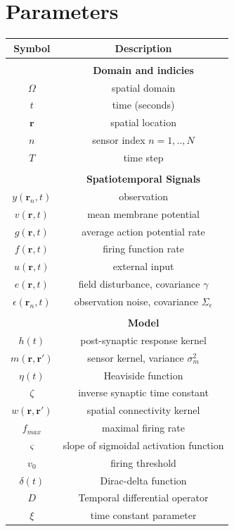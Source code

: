 \documentclass[12pt]{iopart}
\begin{document}
\section{Parameters} 
\begin{tabular}
	{c|c} Symbol & Description \\
	\hline
	\\ & \textbf{Domain and indicies} \\
	\hline
	$\Omega$ & spatial domain \\
	$t$ & time (seconds) \\
	$\mathbf{r}$ & spatial location \\
	$n$ & sensor index $n=1,..,N$ \\
	$T$ & time step \\
	\\ & \textbf{Spatiotemporal Signals} \\
	\hline
	$y(\mathbf{r}_n,t)$ & observation \\
	$v(\mathbf{r},t)$ & mean membrane potential \\
	$g(\mathbf{r},t)$ & average action potential rate \\
	$f(\mathbf{r},t)$ & firing function rate \\
	$u(\mathbf{r},t)$ & external input \\
	$e(\mathbf{r},t)$ & field disturbance, covariance $\gamma$\\
	$\epsilon(\mathbf{r}_n,t)$ & observation noise, covariance $\Sigma_\epsilon$ \\
	\\ & \textbf{Model} \\
	\hline
	$h(t)$ & post-synaptic response kernel \\
	$m(\mathbf{r},\mathbf{r}')$ & sensor kernel, variance $\sigma_m^2$ \\
	$\eta(t)$ & Heaviside function \\
	$\zeta$ & inverse synaptic time constant \\
	$w(\mathbf{r},\mathbf{r}')$ & spatial connectivity kernel \\
	$f_{max}$ & maximal firing rate \\
	$\varsigma$ & slope of sigmoidal activation function \\
	$v_0$ & firing threshold \\
	$\delta(t)$ & Dirac-delta function \\
	$D$ & Temporal differential operator \\
	$\xi$ & time constant parameter \\

\end{tabular}
\end{document}
